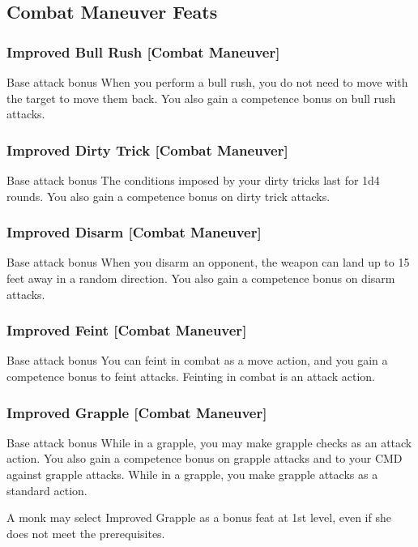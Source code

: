 \subsection{Combat Maneuver Feats}

\subsubsection{Improved Bull Rush [Combat Maneuver]}
 Base attack bonus 
 When you perform a bull rush, you do not need to move with the target to move them back. You also gain a  competence bonus on bull rush attacks.

\subsubsection{Improved Dirty Trick [Combat Maneuver]}
 Base attack bonus 
 The conditions imposed by your dirty tricks last for 1d4 rounds. You also gain a  competence bonus on dirty trick attacks.

\subsubsection{Improved Disarm [Combat Maneuver]}
 Base attack bonus 
 When you disarm an opponent, the weapon can land up to 15 feet away in a random direction. You also gain a  competence bonus on disarm attacks.

\subsubsection{Improved Feint [Combat Maneuver]}
 Base attack bonus 
 You can feint in combat as a move action, and you gain a  competence bonus to feint attacks.
 Feinting in combat is an attack action.

\subsubsection{Improved Grapple [Combat Maneuver]}
 Base attack bonus 
 While in a grapple, you may make grapple checks as an attack action. You also gain a  competence bonus on grapple attacks and to your CMD against grapple attacks.
 While in a grapple, you make grapple attacks as a standard action.
\par A monk may select Improved Grapple as a bonus feat at 1st level, even if she does not meet the prerequisites.

